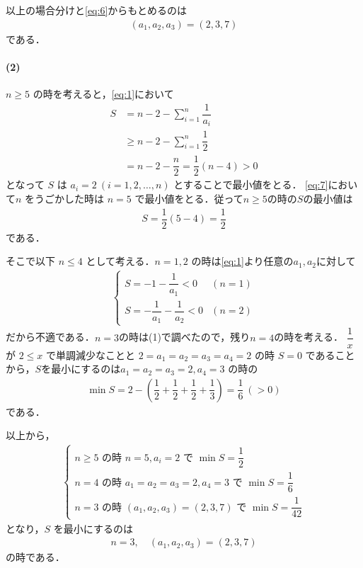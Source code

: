 \documentclass[../../main.tex]{subfiles}
\begin{document}
以上の場合分けと\cref{eq:6}からもとめるのは
\begin{align}
  (a_1, a_2, a_3) = (2, 3, 7)
\end{align}
である．

\paragraph{(2)}

$n \ge 5$ の時を考えると，\cref{eq:1}において
\begin{align}
  S
  & =  n-2 - \sum_{i=1}^n \dfrac{1}{a_i} \\
  &\ge n-2 - \sum_{i=1}^n \dfrac{1}{2} \\
  & =  n-2 - \dfrac{n}{2} = \dfrac{1}{2}(n-4) > 0 \label{eq:7}
\end{align}
となって $S$ は $a_i = 2\ (i=1, 2, \dots, n)$ とすることで最小値をとる．
\cref{eq:7}において$n$ をうごかした時は $n=5$ で最小値をとる．従って$n \ge 5$の時の$S$の最小値は
\begin{align}
  S = \dfrac{1}{2}(5-4) = \dfrac{1}{2} \label{eq:8}
\end{align}
である．

そこで以下 $n \le 4$ として考える．$n=1,2$ の時は\cref{eq:1}より任意の$a_1,a_2$に対して
\begin{align}
  \begin{cases}
    S = -1-\dfrac{1}{a_1}< 0 & (n=1) \\
    S = -\dfrac{1}{a_1}-\dfrac{1}{a_2}< 0 & (n=2)
  \end{cases}
\end{align}
だから不適である．$n=3$の時は(1)で調べたので，残り$n=4$の時を考える．
$\dfrac{1}{x}$ が $2 \le x$ で単調減少なことと $2 = a_1 = a_2 = a_3 = a_4=2$ の時 $S=0$ であることから，$S$を最小にするのは$a_1 = a_2 = a_3 = 2, a_4 = 3$ の時の
\begin{align}
  \min S = 2 - \left(\dfrac{1}{2} + \dfrac{1}{2} + \dfrac{1}{2} + \dfrac{1}{3}\right) = \dfrac{1}{6}\ (>0) \label{eq:9}
\end{align}
である．

以上から，
\begin{align}
  \begin{cases}
    n \ge 5 \text{ の時 } n=5, a_i=2 \text{ で } \min S = \dfrac{1}{2} \\
    n = 4 \text{ の時 } a_1=a_2=a_3=2, a_4=3 \text{ で } \min S = \dfrac{1}{6} \\
    n = 3 \text{ の時 } (a_1, a_2, a_3)=(2,3,7) \text{ で } \min S = \dfrac{1}{42}
  \end{cases}
\end{align}
となり，$S$ を最小にするのは
\begin{align}
  n=3, \quad (a_1, a_2, a_3) = (2, 3, 7)
\end{align}
の時である．

\newpage
\end{document}
